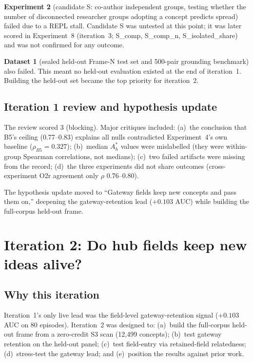 \documentclass[11pt,letterpaper]{article}
\begin{document}
\textbf{Experiment 2} (candidate S: co-author independent groups, testing whether the number of disconnected researcher groups adopting a concept predicts spread) failed due to a REPL stall. Candidate S was untested at this point; it was later scored in Experiment~8 (iteration~3; S\_comp, S\_comp\_n, S\_isolated\_share) and was not confirmed for any outcome.

\textbf{Dataset 1} (sealed held-out Frame-N test set and 500-pair grounding benchmark) also failed. This meant no held-out evaluation existed at the end of iteration~1. Building the held-out set became the top priority for iteration~2.

\subsection{Iteration 1 review and hypothesis update}

The review scored 3 (blocking). Major critiques included: (a)~the conclusion that B5's ceiling (0.77--0.83) explains all nulls contradicted Experiment~4's own baseline ($\rho_{B5} = 0.327$); (b)~median $A^*_h$ values were mislabelled (they were within-group Spearman correlations, not medians); (c)~two failed artifacts were missing from the record; (d)~the three experiments did not share outcomes (cross-experiment O2r agreement only $\rho$ 0.76--0.80).

The hypothesis update moved to ``Gateway fields keep new concepts and pass them on,'' deepening the gateway-retention lead ($+0.103$ AUC) while building the full-corpus held-out frame.

\section{Iteration 2: Do hub fields keep new ideas alive?}
\label{sec:iter2}

\subsection{Why this iteration}

Iteration~1's only live lead was the field-level gateway-retention signal ($+0.103$ AUC on 80 episodes). Iteration~2 was designed to: (a)~build the full-corpus held-out frame from a zero-credit S3 scan (12{,}499 concepts); (b)~test gateway retention on the held-out panel; (c)~test field-entry via retained-field relatedness; (d)~stress-test the gateway lead; and (e)~position the results against prior work.
\end{document}
